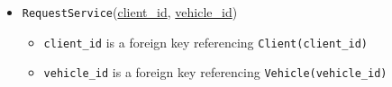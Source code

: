 \documentclass[12pt]{article}
\begin{document}
\begin{itemize}
    \item \texttt{RequestService}(\underline{client\_id}, \underline{vehicle\_id})
    \begin{itemize}
        \item \texttt{client\_id} is a foreign key referencing \texttt{Client(client\_id)}
        \item \texttt{vehicle\_id} is a foreign key referencing \texttt{Vehicle(vehicle\_id)}
    \end{itemize}
    
\end{itemize}
\end{document}
